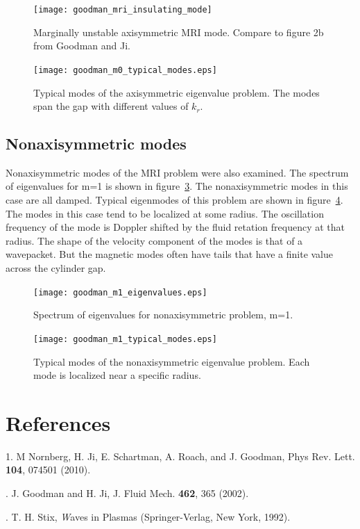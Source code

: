 \documentclass[letterpaper]{article}
\begin{document}
\begin{figure}
\begin{center}
\texttt{[image: goodman\_mri\_insulating\_mode]}
\caption[Marginally unstable axisymmetric MRI mode]{Marginally
  unstable axisymmetric MRI mode. Compare to figure 2{b} from Goodman
  and Ji.}
\label{fig:globalcode:goodman_mri_insulating_mode}
\end{center}
\end{figure}

\begin{figure}
\begin{center}
\texttt{[image: goodman\_m0\_typical\_modes.eps]}
\caption{Typical modes of the axisymmetric eigenvalue problem.  The
  modes span the gap with different values of $k_r$.}
\label{fig:goodmanm0typicalmodes}
\end{center}
\end{figure}

\subsection{Nonaxisymmetric modes}

Nonaxisymmetric modes of the MRI problem were also examined.  The
spectrum of eigenvalues for m=1 is shown in
figure~\ref{fig:goodmanm1eigenvalues}.  The nonaxisymmetric modes in
this case are all damped.  Typical eigenmodes of this problem are
shown in figure~\ref{fig:goodmanm1typicalmodes}.  The modes in this
case tend to be localized at some radius.  The oscillation frequency
of the mode is Doppler shifted by the fluid retation frequency at that
radius.  The shape of the velocity component of the modes is that of a
wavepacket.  But the magnetic modes often have tails that have a
finite value across the cylinder gap.

\begin{figure}
\begin{center}
\texttt{[image: goodman\_m1\_eigenvalues.eps]}
\caption{Spectrum of eigenvalues for nonaxisymmetric problem, m=1.}
\label{fig:goodmanm1eigenvalues}
\end{center}
\end{figure}

\begin{figure}
\begin{center}
\texttt{[image: goodman\_m1\_typical\_modes.eps]}
\caption{Typical modes of the nonaxisymmetric eigenvalue problem.
  Each mode is localized near a specific radius.}
\label{fig:goodmanm1typicalmodes}
\end{center}
\end{figure}


\section{References}
1. M Nornberg, H. Ji, E. Schartman, A. Roach, and J. Goodman, Phys
Rev. Lett. {\bf 104}, 074501 (2010).

. J. Goodman and H. Ji, J. Fluid Mech. {\bf 462}, 365 (2002).

. T. H. Stix, {\emph Waves in Plasmas} (Springer-Verlag,
New York, 1992).
\end{document}

